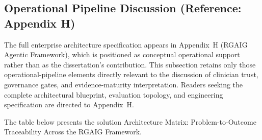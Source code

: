 \subsection{Operational Pipeline Discussion (Reference: Appendix H)}

\noindent The full enterprise architecture specification appears in Appendix~H (RGAIG Agentic Framework), which is positioned as conceptual operational support rather than as the dissertation's contribution. This subsection retains only those operational-pipeline elements directly relevant to the discussion of clinician trust, governance gates, and evidence-maturity interpretation. Readers seeking the complete architectural blueprint, evaluation topology, and engineering specification are directed to Appendix~H.

\iffalse %
\noindent The table below presents the solution Architecture Matrix: Problem-to-Outcome Traceability Across the RGAIG Framework.

